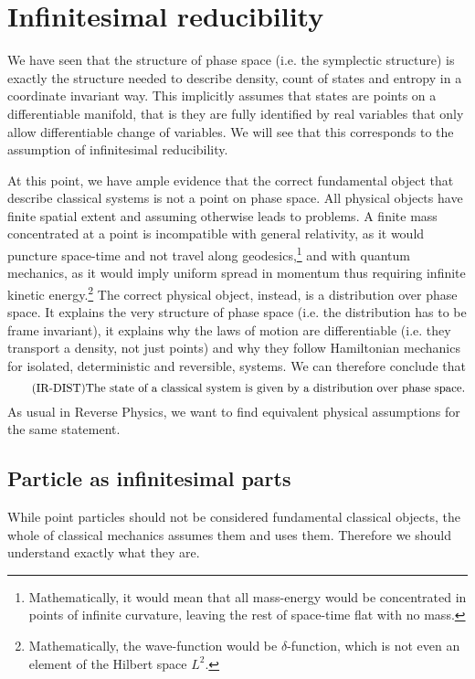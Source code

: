 \section{Infinitesimal reducibility}

We have seen that the structure of phase space (i.e. the symplectic structure) is exactly the structure needed to describe density, count of states and entropy in a coordinate invariant way. This implicitly assumes that states are points on a differentiable manifold, that is they are fully identified by real variables that only allow differentiable change of variables. We will see that this corresponds to the assumption of infinitesimal reducibility.

At this point, we have ample evidence that the correct fundamental object that describe classical systems is not a point on phase space. All physical objects have finite spatial extent and assuming otherwise leads to problems. A finite mass concentrated at a point is incompatible with general relativity, as it would puncture space-time and not travel along geodesics,\footnote{Mathematically, it would mean that all mass-energy would be concentrated in points of infinite curvature, leaving the rest of space-time flat with no mass.} and with quantum mechanics, as it would imply uniform spread in momentum thus requiring infinite kinetic energy.\footnote{Mathematically, the wave-function would be $\delta$-function, which is not even an element of the Hilbert space $L^2$.} The correct physical object, instead, is a distribution over phase space. It explains the very structure of phase space (i.e. the distribution has to be frame invariant), it explains why the laws of motion are differentiable (i.e. they transport a density, not just points) and why they follow Hamiltonian mechanics for isolated, deterministic and reversible, systems. We can therefore conclude that
\begin{equation}\tag{IR-DIST}\label{rp-cm-ir-condDistributionOverPhaseSpace}
	\eqtext{The state of a classical system is given by a distribution over phase space.}
\end{equation}
As usual in Reverse Physics, we want to find equivalent physical assumptions for the same statement.

\subsection{Particle as infinitesimal parts}
While point particles should not be considered fundamental classical objects, the whole of classical mechanics assumes them and uses them. Therefore we should understand exactly what they are.

